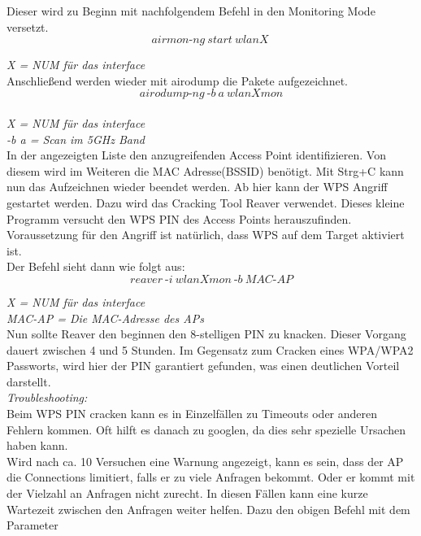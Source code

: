 Dieser wird zu Beginn mit nachfolgendem Befehl in den Monitoring Mode versetzt.\\

$$airmon\text{-}ng~start~wlanX~$$

\textit{X = NUM für das interface}\\


Anschließend werden wieder mit airodump die Pakete aufgezeichnet. \\

$$airodump\text{-}ng~\text{-}b~a~wlanXmon$$\\
	 
	\textit{X = NUM für das interface}\\
	\textit{-b a = Scan im 5GHz Band}\\	

In der angezeigten Liste den anzugreifenden Access Point identifizieren. Von diesem wird im Weiteren die MAC Adresse(BSSID) benötigt.
Mit Strg+C kann nun das Aufzeichnen wieder beendet werden. Ab hier kann der WPS Angriff gestartet werden. Dazu wird das Cracking Tool Reaver verwendet. Dieses kleine Programm versucht den WPS PIN des Access Points herauszufinden. Voraussetzung für den Angriff ist natürlich, dass WPS auf dem Target aktiviert ist. \\

Der Befehl sieht dann wie folgt aus:\\


$$reaver~\text{-}i~wlanXmon~\text{-}b~MAC\text{-}AP$$

\textit{X = NUM für das interface}\\ 
\textit{MAC-AP = Die MAC-Adresse des APs}\\ 

Nun sollte Reaver den beginnen den 8-stelligen PIN zu knacken. Dieser Vorgang dauert zwischen 4 und 5 Stunden. Im Gegensatz zum Cracken eines WPA/WPA2 Passworts, wird hier der PIN garantiert gefunden, was einen deutlichen Vorteil darstellt. \\

\textit{Troubleshooting:}\\

Beim WPS PIN cracken kann es in Einzelfällen zu Timeouts oder anderen Fehlern kommen. Oft hilft es danach zu googlen, da dies sehr spezielle Ursachen haben kann. \\

Wird nach ca. 10 Versuchen eine Warnung angezeigt, kann es sein, dass der AP die Connections limitiert, falls er zu viele Anfragen bekommt. Oder er kommt mit der Vielzahl an Anfragen nicht zurecht. In diesen Fällen kann eine kurze Wartezeit zwischen den Anfragen weiter helfen. Dazu den obigen Befehl mit dem Parameter\\

